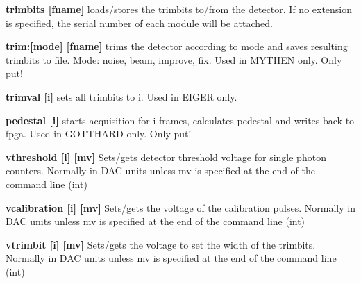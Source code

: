 \begin{DoxyItemize}
\item {\bfseries trimbits \mbox{[}fname\mbox{]} } loads/stores the trimbits to/from the detector. If no extension is specified, the serial number of each module will be attached.
\end{DoxyItemize}


\begin{DoxyItemize}
\item {\bfseries trim:\mbox{[}mode\mbox{]} \mbox{[}fname\mbox{]}} trims the detector according to mode and saves resulting trimbits to file. Mode: noise, beam, improve, fix. Used in MYTHEN only. Only put!
\end{DoxyItemize}


\begin{DoxyItemize}
\item {\bfseries trimval \mbox{[}i\mbox{]}} sets all trimbits to i. Used in EIGER only.
\end{DoxyItemize}


\begin{DoxyItemize}
\item {\bfseries pedestal \mbox{[}i\mbox{]}} starts acquisition for i frames, calculates pedestal and writes back to fpga. Used in GOTTHARD only. Only put!
\end{DoxyItemize}


\begin{DoxyItemize}
\item {\bfseries vthreshold \mbox{[}i\mbox{]} \mbox{[}mv\mbox{]}} Sets/gets detector threshold voltage for single photon counters. Normally in DAC units unless {\ttfamily mv} is specified at the end of the command line (int)
\end{DoxyItemize}


\begin{DoxyItemize}
\item {\bfseries vcalibration \mbox{[}i\mbox{]} \mbox{[}mv\mbox{]}} Sets/gets the voltage of the calibration pulses. Normally in DAC units unless {\ttfamily mv} is specified at the end of the command line (int)
\end{DoxyItemize}


\begin{DoxyItemize}
\item {\bfseries vtrimbit \mbox{[}i\mbox{]} \mbox{[}mv\mbox{]}} Sets/gets the voltage to set the width of the trimbits. Normally in DAC units unless {\ttfamily mv} is specified at the end of the command line (int)
\end{DoxyItemize}


